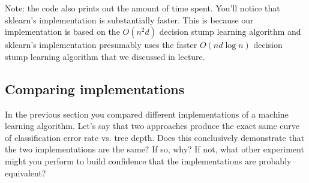 \documentclass{article}
\begin{document}
Note: the code also prints out the amount of time spent. You'll notice that sklearn's implementation is substantially faster. This is because
our implementation is based on the $O(n^2d)$ decision stump learning algorithm and sklearn's implementation presumably uses the faster $O(nd\log n)$
decision stump learning algorithm that we discussed in lecture.

\subsection{Comparing implementations}

In the previous section you compared different implementations of a machine learning algorithm. Let's say that two
approaches produce the exact same curve of classification error rate vs. tree depth. Does this conclusively demonstrate
that the two implementations are the same? If so, why? If not, what other experiment might you perform to build confidence
that the implementations are probably equivalent?
\end{document}
